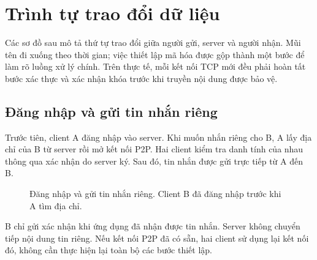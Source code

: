 \section{Trình tự trao đổi dữ liệu}

Các sơ đồ sau mô tả thứ tự trao đổi giữa người gửi, server và người nhận.
Mũi tên đi xuống theo thời gian; việc thiết lập mã hóa được gộp thành một bước
để làm rõ luồng xử lý chính. Trên thực tế, mỗi kết nối TCP mới đều phải hoàn tất
bước xác thực và xác nhận khóa trước khi truyền nội dung được bảo vệ.

\subsection{Đăng nhập và gửi tin nhắn riêng}

Trước tiên, client A đăng nhập vào server. Khi muốn nhắn riêng cho B, A lấy địa
chỉ của B từ server rồi mở kết nối P2P. Hai client kiểm tra danh tính của nhau
thông qua xác nhận do server ký. Sau đó, tin nhắn được gửi trực tiếp từ A đến B.

\begin{figure}[H]
\centering
{}
\caption{Đăng nhập và gửi tin nhắn riêng. Client B đã đăng nhập trước khi A tìm địa chỉ.}
\label{fig:seq-private-message}
\end{figure}

B chỉ gửi xác nhận khi ứng dụng đã nhận được tin nhắn. Server không chuyển tiếp
nội dung tin riêng. Nếu kết nối P2P đã có sẵn, hai client sử dụng lại kết nối đó,
không cần thực hiện lại toàn bộ các bước thiết lập.

